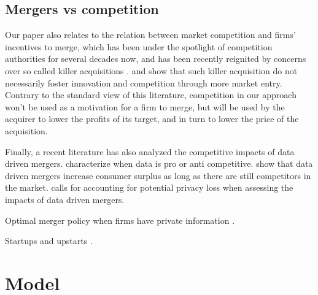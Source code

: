 \documentclass[a4paper,leqno]{article}%
\begin{document}
\medskip

\subsection{Mergers vs competition}

Our paper also relates to the relation between market competition and firms' incentives to merge, which has been under the spotlight of competition authorities for several decades now, and has been recently reignited by concerns over so called killer acquisitions \citep{cunningham2019killer}. \cite{kamepalli2020kill} and \cite{motta2021kill} show that such killer acquisition do not necessarily foster innovation and competition through more market entry. Contrary to the standard view of this literature, competition in our approach won't be used as a motivation for a firm to merge, but will be used by the acquirer to lower the profits of its target, and in turn to lower the price of the acquisition.

Finally, a recent literature has also analyzed the competitive impacts of data driven mergers. \cite{de2020data} characterize when data is pro or anti competitive. \cite{chen2020data} show that data driven mergers increase consumer surplus as long as there are still competitors in the market. \cite{chirita2018data} calls for accounting for potential privacy loss when assessing the impacts of data driven mergers.



Optimal merger policy when firms have private information \cite{Besanko1993}.

Startups and upstarts \cite{awaya2021startups}.


\section{Model}
\end{document}
